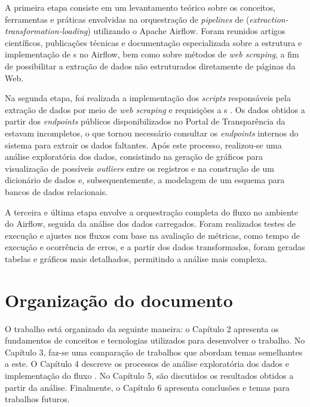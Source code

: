 \documentclass[
	12pt,				%
	oneside,			%
	a4paper,			%
	chapter=TITLE,		%
	section=TITLE,		%
	english,			%
	brazil				%
	]{abntex2}
\begin{document}
A primeira etapa consiste em um levantamento teórico sobre os conceitos, ferramentas e práticas envolvidas na orquestração de \textit{pipelines} de  (\textit{extraction-transformation-loading}) utilizando o Apache Airflow. Foram reunidos artigos científicos, publicações técnicas e documentação especializada sobre a estrutura e implementação de s no Airflow, bem como sobre métodos de \textit{web scraping}, a fim de possibilitar a extração de dados não estruturados diretamente de páginas da Web.

Na segunda etapa, foi realizada a implementação dos \textit{scripts} responsáveis pela extração de dados por meio de \textit{web scraping} e requisições a s . Os dados obtidos a partir dos \textit{endpoints} públicos disponibilizados no Portal de Transparência da  estavam incompletos, o que tornou necessário consultar os \textit{endpoints} internos do sistema para extrair os dados faltantes. Após este processo, realizou-se uma análise exploratória dos dados, consistindo na geração de gráficos para visualização de possíveis \textit{outliers} entre os registros e na construção de um dicionário de dados e, subsequentemente, a modelagem de um esquema para bancos de dados relacionais.

A terceira e última etapa envolve a orquestração completa do fluxo  no ambiente do Airflow, seguida da análise dos dados carregados. Foram realizados testes de execução e ajustes nos fluxos com base na avaliação de métricas, como tempo de execução e ocorrência de erros, e a partir dos dados transformados, foram geradas tabelas e gráficos mais detalhados, permitindo a análise mais complexa.

\section{Organização do documento}

O trabalho está organizado da seguinte maneira: o Capítulo 2 apresenta os fundamentos de conceitos e tecnologias utilizados para desenvolver o trabalho. No Capítulo 3, faz-se uma comparação de trabalhos que abordam temas semelhantes a este. O Capítulo 4 descreve os processos de análise exploratória dos dados e implementação do fluxo . No Capítulo 5, são discutidos os resultados obtidos a partir da análise. Finalmente, o Capítulo 6 apresenta conclusões e temas para trabalhos futuros.
\end{document}
